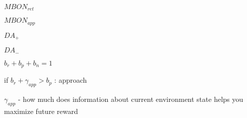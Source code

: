 $MBON_{ret}$

$MBON_{app}$

$DA_{+}$

$DA_{-}$

$b_{r} + b_{p} + b_{n} = 1$

if $b_{r} + \gamma_{app} > b_{p}$ : approach

$\gamma_{app}$ - how much does information about current environment state helps you maximize future reward